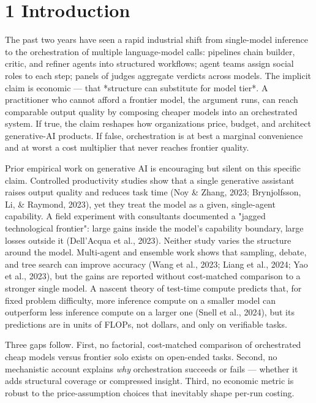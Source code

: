 \documentclass[11pt,a4paper]{article}
\begin{document}
\section{1 Introduction}

The past two years have seen a rapid industrial shift from single-model
inference to the orchestration of multiple language-model calls: pipelines
chain builder, critic, and refiner agents into structured workflows; agent
teams assign social roles to each step; panels of judges aggregate verdicts
across models. The implicit claim is economic — that *structure can
substitute for model tier*. A practitioner who cannot afford a frontier
model, the argument runs, can reach comparable output quality by composing
cheaper models into an orchestrated system. If true, the claim reshapes how
organizations price, budget, and architect generative-AI products. If
false, orchestration is at best a marginal convenience and at worst a cost
multiplier that never reaches frontier quality.

Prior empirical work on generative AI is encouraging but silent on this
specific claim. Controlled productivity studies show that a single generative
assistant raises output quality and reduces task time (Noy \& Zhang, 2023;
Brynjolfsson, Li, \& Raymond, 2023), yet they treat the model as a given,
single-agent capability. A field experiment with consultants documented a
"jagged technological frontier": large gains inside the model's capability
boundary, large losses outside it (Dell'Acqua et al., 2023). Neither study
varies the structure around the model. Multi-agent and ensemble work shows
that sampling, debate, and tree search can improve accuracy (Wang et al.,
2023; Liang et al., 2024; Yao et al., 2023), but the gains are reported
without cost-matched comparison to a stronger single model. A nascent
theory of test-time compute predicts that, for fixed problem difficulty,
more inference compute on a smaller model can outperform less inference
compute on a larger one (Snell et al., 2024), but its predictions are in
units of FLOPs, not dollars, and only on verifiable tasks.

Three gaps follow. First, no factorial, cost-matched comparison of
orchestrated cheap models versus frontier solo exists on open-ended
tasks. Second, no mechanistic account explains \textit{why} orchestration succeeds
or fails — whether it adds structural coverage or compressed insight.
Third, no economic metric is robust to the price-assumption choices that
inevitably shape per-run costing.
\end{document}
